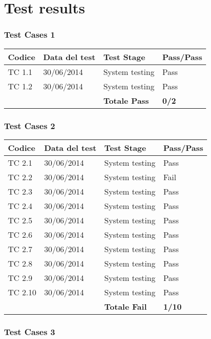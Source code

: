 \chapter{Test results}

\subsection{Test Cases 1}

\begin{tabular}{|p{3cm}|p{3cm}|p{3cm}|p{3cm}|}
	\hline
	\rowcolor{Gray}
	\textbf{Codice} & \textbf{Data del test} & \textbf{Test Stage}  & \textbf{Pass/Pass}\tabularnewline
	\hline
	TC 1.1			& 30/06/2014 			& System testing		& Pass \tabularnewline
	\hline
	TC 1.2			& 30/06/2014 			& System testing		& Pass \tabularnewline
	\hline
					& 						& \textbf{Totale Pass}	& \textbf{0/2} \tabularnewline
	\hline
\end{tabular}

\subsection{Test Cases 2}

\begin{tabular}{|p{3cm}|p{3cm}|p{3cm}|p{3cm}|}
	\hline
	\rowcolor{Gray}
	\textbf{Codice} & \textbf{Data del test} & \textbf{Test Stage} & \textbf{Pass/Pass}\tabularnewline
	\hline
	TC 2.1			& 30/06/2014 			& System testing		& Pass \tabularnewline
	\hline
	TC 2.2			& 30/06/2014 			& System testing		& Fail \tabularnewline
	\hline
	TC 2.3			& 30/06/2014 			& System testing		& Pass \tabularnewline
	\hline
	TC 2.4			& 30/06/2014 			& System testing		& Pass \tabularnewline
	\hline
	TC 2.5			& 30/06/2014 			& System testing		& Pass \tabularnewline
	\hline
	TC 2.6			& 30/06/2014 			& System testing		& Pass \tabularnewline
	\hline
	TC 2.7			& 30/06/2014 			& System testing		& Pass \tabularnewline
	\hline
	TC 2.8			& 30/06/2014 			& System testing		& Pass \tabularnewline
	\hline
	TC 2.9			& 30/06/2014 			& System testing		& Pass \tabularnewline
	\hline
	TC 2.10			& 30/06/2014 			& System testing		& Pass \tabularnewline
	\hline
					& 						& \textbf{Totale Fail}	& \textbf{1/10} \tabularnewline
	\hline
\end{tabular}

\subsection{Test Cases 3}

